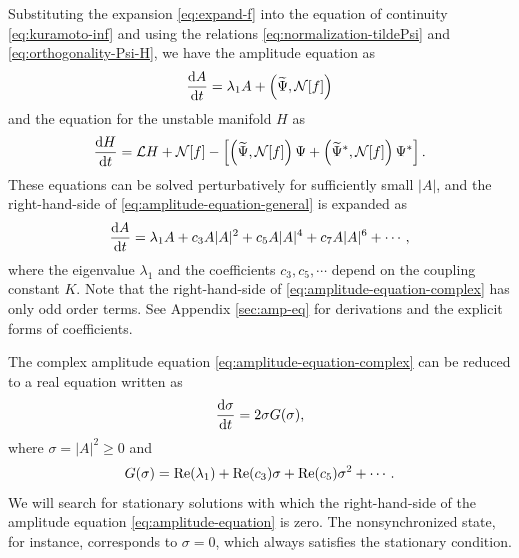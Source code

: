 Substituting the expansion \eqref{eq:expand-f}
into the equation of continuity \eqref{eq:kuramoto-inf}
and using the relations \eqref{eq:normalization-tildePsi}
and \eqref{eq:orthogonality-Psi-H},
we have the amplitude equation as
\begin{align}
  \label{eq:amplitude-equation-general}
  \frac{{\rm d}A}{{\rm d}t}
  = \lambda_{1} A + \left( \widetilde{\Psi}, \mathcal{N}[f] \right)
\end{align}
and the equation for the unstable manifold $H$ as
\begin{align}
  \frac{{\rm d}H}{{\rm d}t}
  = \mathcal{L}H + \mathcal{N}[f]
  - \left[
    \left( \widetilde{\Psi}, \mathcal{N}[f] \right) \Psi
    + \left( \widetilde{\Psi}^{\ast}, \mathcal{N}[f] \right) \Psi^{\ast}
  \right].
  \label{eq:unstable-manifold-H}
\end{align}
These equations can be solved perturbatively for sufficiently small $|A|$,
and the right-hand-side of \eqref{eq:amplitude-equation-general}
is expanded as
\begin{align}
  \label{eq:amplitude-equation-complex}
  \frac{{\rm d}A}{{\rm d}t}
  = \lambda_{1} A + c_{3} A|A|^{2} + c_{5} A|A|^{4} + c_{7} A|A|^{6} + \cdots,
\end{align}
where the eigenvalue $\lambda_{1}$ and the coefficients $c_{3},c_{5},\cdots$
depend on the coupling constant $K$.
Note that the right-hand-side of \eqref{eq:amplitude-equation-complex}
has only odd order terms.
See Appendix \ref{sec:amp-eq} for derivations
and the explicit forms of coefficients.

The complex amplitude equation \eqref{eq:amplitude-equation-complex} can be
reduced to a real equation written as
\begin{align}
  \label{eq:amplitude-equation}
  \frac{{\rm d}\sigma}{{\rm d}t} = 2 \sigma G(\sigma),
\end{align}
where $\sigma=|A|^{2}\geq 0$ and
\begin{align}
  \label{eq:G-sigma}
  G(\sigma) = {\rm Re}(\lambda_{1}) + {\rm Re}(c_{3})\sigma
  + {\rm Re}(c_{5})\sigma^{2} + \cdots.
\end{align}
We will search for stationary solutions
with which the right-hand-side of the amplitude equation
\eqref{eq:amplitude-equation} is zero.
The nonsynchronized state,
for instance, corresponds to $\sigma=0$,
which always satisfies the stationary condition.

